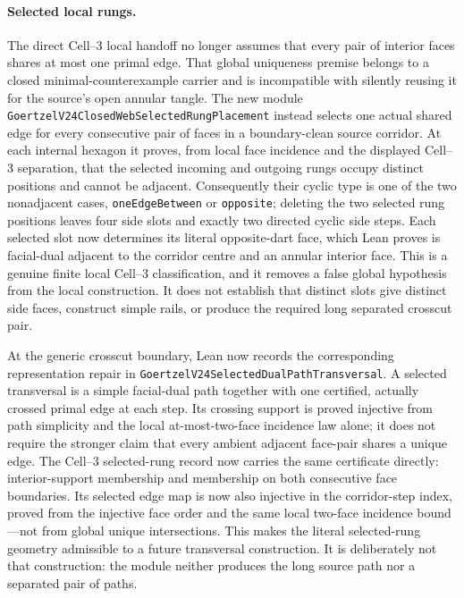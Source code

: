 \documentclass[11pt]{article}
\theoremstyle{definition}
\begin{document}
\paragraph{Selected local rungs.}  The direct Cell--3 local handoff no longer
assumes that every pair of interior faces shares at most one primal edge.
That global uniqueness premise belongs to a closed minimal-counterexample
carrier and is incompatible with silently reusing it for the source's open
annular tangle.  The new module
\texttt{GoertzelV24ClosedWebSelectedRungPlacement} instead selects one actual
shared edge for every consecutive pair of faces in a boundary-clean source
corridor.  At each internal hexagon it proves, from local face incidence and
the displayed Cell--3 separation, that the selected incoming and outgoing
rungs occupy distinct positions and cannot be adjacent.  Consequently their
cyclic type is one of the two nonadjacent cases,
\texttt{oneEdgeBetween} or \texttt{opposite}; deleting the two selected
rung positions leaves four side slots and exactly two directed cyclic side
steps.  Each selected slot now determines its literal opposite-dart face,
which Lean proves is facial-dual adjacent to the corridor centre and an
annular interior face.  This is a genuine finite local Cell--3 classification,
and it removes a false global hypothesis from the local construction.  It
does not establish that distinct slots give distinct side faces, construct
simple rails, or produce the required long separated crosscut pair.

At the generic crosscut boundary, Lean now records the corresponding
representation repair in
\texttt{GoertzelV24SelectedDualPathTransversal}.  A selected transversal is a
simple facial-dual path together with one certified, actually crossed primal
edge at each step.  Its crossing support is proved injective from path
simplicity and the local at-most-two-face incidence law alone; it does not
require the stronger claim that every ambient adjacent face-pair shares a
unique edge.  The Cell--3 selected-rung record now carries the same certificate
directly: interior-support membership and membership on both consecutive face
boundaries.  Its selected edge map is now also injective in the corridor-step
index, proved from the injective face order and the same local two-face
incidence bound---not from global unique intersections.  This makes the
literal selected-rung geometry admissible to a future transversal
construction.  It is deliberately not that construction: the module neither
produces the long source path nor a separated pair of paths.
\end{document}
